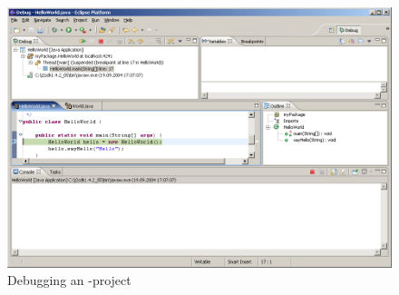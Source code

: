 \begin{itemize}
\begin{figure}[htbp]
	\centering
		\includegraphics[width=1.0\textwidth]{images/debug1.png}
	\caption{Debugging an \caesarj -project}
	\label{fig:debug1}
\end{figure}
\end{itemize}
